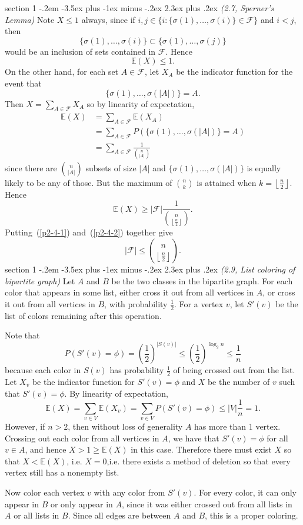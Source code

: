 \documentclass[12pt]{article}
\makeatletter
\theoremstyle{norm}
\newcommand{\E}[0]{\mathbb{E}}
\providecommand{\cal}[1]{\mathcal{#1}}
\renewcommand{\cal}[1]{\mathcal{#1}}
\newcommand{\rc}[1]{\frac{1}{#1}}
\newcommand{\sub}[0]{\subset}
\newcommand{\pa}[1]{\left( {#1} \right)}
\newcommand{\fl}[1]{\left\lfloor {#1}\right\rfloor}
\newcommand{\prc}[1]{\pa{\rc{#1}}}
\newenvironment{problem}{\@startsection
       {section}
       {1}
       {-.2em}
       {-3.5ex plus -1ex minus -.2ex}
       {2.3ex plus .2ex}
       {\pagebreak[3]%
       \large\bf\noindent{Problem }
       }
       }
       {%
       }
\makeatother
\begin{document}
\begin{problem} {\it (2.7, Sperner's Lemma)}
Note $X\leq 1$ always, since if $i,j\in \{i:\{\sigma(1),\ldots, \sigma(i)\}\in \cal F\}$ and $i<j$, then
\[
\{\sigma(1),\ldots, \sigma(i)\}\sub\{\sigma(1),\ldots, \sigma(j)\}
\]
would be an inclusion of sets contained in $\cal F$. Hence
\begin{equation}\label{p2-4-1}
\E(X)\leq 1.
\end{equation}
On the other hand, for each set $A\in \cal F$, let $X_A$ be the indicator function for the event that
\[
\{\sigma(1),\ldots, \sigma(|A|)\}=A.
\]
Then $X=\sum_{A\in \cal F}X_A$ so by linearity of expectation,
\begin{align*}
\E(X)&=\sum_{A\in \cal F} \E(X_A)\\
&=\sum_{A\in \cal F}P(\{\sigma(1),\ldots, \sigma(|A|)\}=A)\\
&=\sum_{A\in \cal F}\rc{\binom{n}{|A|}}
\end{align*}
since there are $\binom{n}{|A|}$ subsets of size $|A|$ and $\{\sigma(1),\ldots, \sigma(|A|)\}$ is equally likely to be any of those. But the maximum of $\binom{n}{k}$ is attained when $k=\fl{\frac n2}$. Hence
\begin{equation}\label{p2-4-2}
\E(X)\geq |\cal F|\rc{\binom{n}{\fl{\frac n2}}}.
\end{equation}
Putting~(\ref{p2-4-1}) and~(\ref{p2-4-2}) together give
\[
|\cal F|\leq \binom{n}{\fl{\frac n2}}.
\]
\end{problem}
\begin{problem} {\it (2.9, List coloring of bipartite graph)}
Let $A$ and $B$ be the two classes in the bipartite graph. 
For each color that appears in some list, either cross it out from all vertices in $A$, or cross it out from all vertices in $B$, with probability $\rc{2}$. For a vertex $v$, let $S'(v)$ be the list of colors remaining after this operation.

Note that
\[
P(S'(v)=\phi)=\prc{2}^{|S(v)|}\leq \prc{2}^{\log_2 n}\leq \rc{n}\]
because each color in $S(v)$ has probability $\rc{2}$ of being crossed out from the list. Let $X_v$ be the indicator function for $S'(v)=\phi$ and $X$ be the number of $v$ such that $S'(v)=\phi$. By linearity of expectation,
\[
\E(X)=\sum_{v\in V}\E(X_v)=\sum_{v\in V}P(S'(v)=\phi)\leq |V|\rc{n}=1.
\]
However, if $n>2$, then without loss of generality $A$ has more than 1 vertex. Crossing out each color from all vertices in $A$, we have that $S'(v)=\phi$ for all $v\in A$, and hence $X>1\geq \E(X)$ in this case. Therefore there must exist $X$ so that $X<\E(X)$, i.e. $X=0$,i.e. there exists a method of deletion so that every vertex still has a nonempty list.

Now color each vertex $v$ with any color from $S'(v)$. For every color, it can only appear in $B$ or only appear in $A$, since it was either crossed out from all lists in $A$ or all lists in $B$. Since all edges are between $A$ and $B$, this is a proper coloring.
\end{problem}
\end{document}
